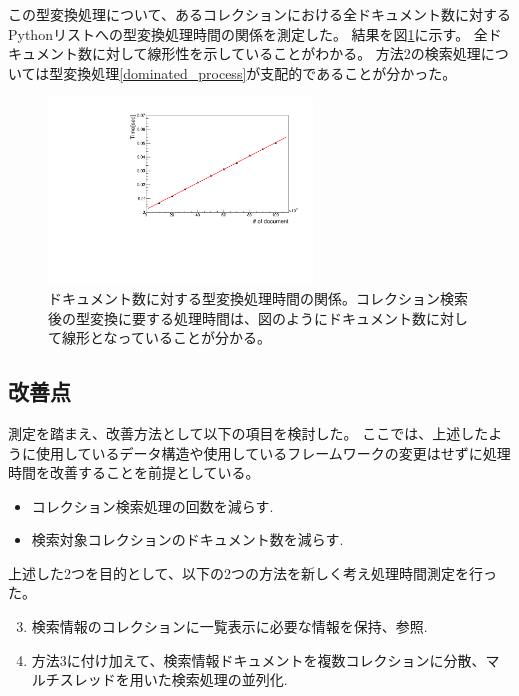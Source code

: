 この型変換処理について、あるコレクションにおける全ドキュメント数に対するPythonリストへの型変換処理時間の関係を測定した。
結果を図\ref{dominated_process_relation}に示す。
全ドキュメント数に対して線形性を示していることがわかる。
方法2の検索処理については型変換処理\ref{dominated_process}が支配的であることが分かった。
\begin{figure}[bpt]
  \begin{center}
    \includegraphics[width=7cm,angle=270]{./dominated_process_relation.pdf}
  \caption[ドキュメント数に対する型変換処理時間の関係]{ドキュメント数に対する型変換処理時間の関係。コレクション検索後の型変換に要する処理時間は、図のようにドキュメント数に対して線形となっていることが分かる。}
  \label{dominated_process_relation}
  \end{center}
\end{figure}

\subsection{改善点}

測定を踏まえ、改善方法として以下の項目を検討した。
ここでは、上述したように使用しているデータ構造や使用しているフレームワークの変更はせずに処理時間を改善することを前提としている。
\begin{itemize}
  \item コレクション検索処理の回数を減らす.
  \item 検索対象コレクションのドキュメント数を減らす.
\end{itemize}

上述した2つを目的として、以下の2つの方法を新しく考え処理時間測定を行った。

\begin{enumerate}
  \setcounter{enumi}{2}
  \item 検索情報のコレクションに一覧表示に必要な情報を保持、参照.
  \item 方法3に付け加えて、検索情報ドキュメントを複数コレクションに分散、マルチスレッドを用いた検索処理の並列化.
\end{enumerate}

